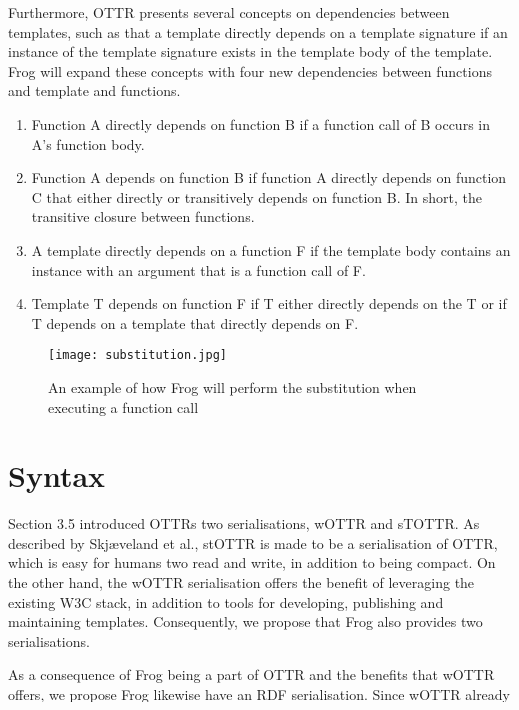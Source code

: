 \para 
Furthermore, OTTR presents several concepts on dependencies between templates, such as that a template directly depends on a template signature if an instance of the template signature exists in the template body of the template\autocite[484]{SLKF_OTTR_2018}. Frog will expand these concepts with four new dependencies between functions and template and functions.
\begin{enumerate}
    \item Function A directly depends on function B if a function call of B occurs in A's function body. 
    \item Function A depends on function B if function A directly depends on function C that either directly or transitively depends on function B. In short, the transitive closure between functions.
    \item A template directly depends on a function F if the template body contains an instance with an argument that is a function call of F. 
    \item Template T depends on function F if T either directly depends on the T or if T depends on a template that directly depends on F. 
\end{enumerate}

\begin{figure}
    \centering
    \texttt{[image: substitution.jpg]}
    \caption{An example of how Frog will perform the substitution when executing a function call}
    \label{fig:substitution_example}
\end{figure}

\section{Syntax}
Section 3.5 introduced OTTRs two serialisations, wOTTR and sTOTTR. As described by Skjæveland et al., stOTTR is made to be a serialisation of OTTR, which is easy for humans two read and write, in addition to being compact\autocite[4]{SLKK_OTTR_2021}. On the other hand, the wOTTR serialisation offers the benefit of leveraging the existing W3C stack, in addition to tools for developing, publishing and maintaining templates\autocite[481-482]{SLKF_OTTR_2018}. Consequently, we propose that Frog also provides two serialisations.

\para
As a consequence of Frog being a part of OTTR and the benefits that wOTTR offers, we propose Frog likewise have an RDF serialisation. Since wOTTR already benefits from leveraging the existing W3C stack, we need to preserve this benefit when adding Frog. For wOTTR to preserve the property of leveraging the W3C stack, everything wOTTR utilises, in this case, Frog, should a possibility of preserving it.  Additionally, wOTTR is the proposed serialisation of OTTR for publishing temp. Hence it will be reasonable to assume when publishing OTTR templates in wOTTR that the Frog functions utilised by the templates are published among the templates in the same format.  

